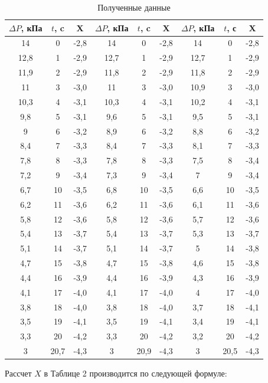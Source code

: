 \documentclass[a4paper]{article}
\begin{document}
\begin{table}[H]
    \centering
    \begin{tabular}{|c|c|c|c|c|c|c|c|c|} \hline 
         $\Delta P$, кПа& $t$, c & X & $\Delta P$, кПа& $t$, c &  X &$\Delta P$, кПа& $t$, с & X \\ \hline 
         14
&  0
&  -2,8
&  14
&  0
&  -2,8
&  14
&  0
& -2,8
\\ \hline 
         12,8
&  1
&  -2,9
&  12,7
&  1
&  -2,9
&  12,7
&  1
& -2,9
\\ \hline 
         11,9
&  2
&  -2,9
&  11,8
&  2
&  -2,9
&  11,8
&  2
& -2,9
\\ \hline 
         11
&  3
&  -3,0
&  11
&  3
&  -3,0
&  10,9
&  3
& -3,0
\\ \hline 
         10,3
&  4
&  -3,1
&  10,3
&  4
&  -3,1
&  10,2
&  4
& -3,1
\\ \hline 
         9,8
&  5
&  -3,1
&  9,6
&  5
&  -3,1
&  9,5
&  5
& -3,1
\\ \hline 
         9
&  6
&  -3,2
&  8,9
&  6
&  -3,2
&  8,8
&  6
& -3,2
\\ \hline 
         8,4
&  7
&  -3,3
&  8,4
&  7
&  -3,3
&  8,1
&  7
& -3,3
\\ \hline 
         7,8
&  8
&  -3,3
&  7,8
&  8
&  -3,3
&  7,5
&  8
& -3,4
\\ \hline
         7,2
&  9
&  -3,4
&  7,3
&  9
&  -3,4
&  7
&  9
& -3,4
\\ \hline 
         6,7
&  10
&  -3,5
&  6,8
&  10
&  -3,5
&  6,6
&  10
& -3,5
\\ \hline 
         6,2
&  11
&  -3,6
&  6,2
&  11
&  -3,6
&  6,1
&  11
& -3,6
\\ \hline 
         5,8
&  12
&  -3,6
&  5,8
&  12
&  -3,6
&  5,7
&  12
& -3,6
\\ \hline 
         5,4
&  13
&  -3,7
&  5,4
&  13
&  -3,7
&  5,3
&  13
& -3,7
\\ \hline 
         5,1
&  14
&  -3,7
&  5,1
&  14
&  -3,7
&  5
&  14
& -3,8
\\ \hline 
         4,7
&  15
&  -3,8
&  4,7
&  15
&  -3,8
&  4,6
&  15
& -3,8
\\ \hline 
         4,4
&  16
&  -3,9
&  4,4
&  16
&  -3,9
&  4,3
&  16
& -3,9
\\ \hline 
         4,1
&  17
&  -4,0
&  4,1
&  17
&  -4,0
&  4
&  17
& -4,0
\\ \hline 
         3,8
&  18
&  -4,0
&  3,8
&  18
&  -4,0
&  3,7
&  18
& -4,1
\\ \hline
         3,5
&  19
&  -4,1
&  3,5
&  19
&  -4,1
&  3,4
&  19
& -4,1
\\ \hline 
         3,3
&  20
&  -4,2
&  3,3
&  20
&  -4,2
&  3,2
&  20
& -4,2
\\ \hline 
         3
&  20,7
&  -4,3
&  3
&  20,9
&  -4,3
&  3
&  20,5
& -4,3
\\ \hline
    \end{tabular}
    \caption{Полученные данные}
    \label{tab:my_label}
\end{table}
Рассчет $X$ в Таблице 2 производится по следующей формуле:
\end{document}

